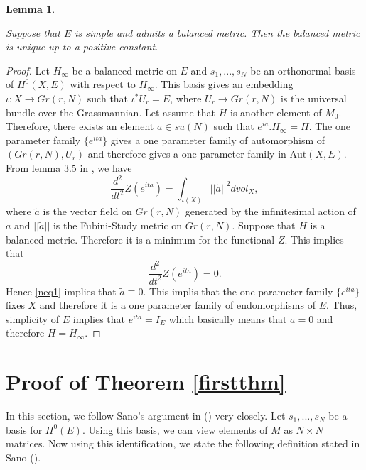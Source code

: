 \documentclass[12pt,oneside,notitlepage]{amsart}
\newtheorem{lem}[thm]{Lemma}
\theoremstyle{definition}
\theoremstyle{remark}
\numberwithin{equation}{section}
\begin{document}
\begin{lem}\label{newlem2}

Suppose that $E$ is simple and admits a balanced metric. Then the
balanced metric is unique up to a positive constant.

\end{lem}

\begin{proof}

Let $H_{\infty}$ be a balanced metric on $E$ and $s_{1},...,
s_{N}$ be an orthonormal basis of $H^{0}(X,E)$ with respect to
$H_{\infty}$. This basis gives an embedding $\iota : X \rightarrow
Gr(r,N)$ such that $\iota^* U_{r}=E$, where $U_{r}\rightarrow
Gr(r,N)$ is the universal bundle over the Grassmannian. Let assume
that $H$ is another element of $M_{0}$. Therefore, there exists an
element $a \in su(N)$ such that $e^{ia} . H_{\infty}=H$. The one
parameter family $\{ e^{ita} \}$ gives a one parameter family of
automorphism of $(Gr(r,N),U_{r})$ and therefore gives a one
parameter family in $\textrm{Aut}(X,E)$. From lemma 3.5 in
\cite{W}, we have
\begin{equation}\label{neq1} \frac{d^2}{dt^2}Z(e^{ita})=\int_{\iota(X)} ||\tilde{a}||^2
dvol_{X},\end{equation} where $\tilde{a}$ is the vector field on
$Gr(r,N)$ generated by the infinitesimal action of $a$ and
$||\tilde{a}||$ is the Fubini-Study metric on $Gr(r,N)$. Suppose
that $H$ is a balanced metric. Therefore it is a minimum for the
functional $Z$. This implies that
$$\frac{d^2}{dt^2}Z(e^{ita})=0.$$
Hence \eqref{neq1} implies that $\tilde{a}\equiv 0.$ This implis
that the one parameter family $\{ e^{ita} \}$ fixes $X$ and
therefore it is a one parameter family of endomorphisms of $E$.
Thus, simplicity of $E$ implies that $ e^{ita}= I_{E}$ which
basically means that $a=0$ and therefore $H=H_{\infty}$.

\end{proof}

\section{Proof of Theorem \ref{firstthm}}

In this section, we follow Sano's argument in (\cite[Section
3]{S}) very closely. Let $s_{1},...,s_{N} $ be a basis for
$H^0(E)$. Using this basis, we can view elements of $M$ as $N
\times N$ matrices. Now using this identification, we state the
following definition stated in Sano (\cite{S}).
\end{document}

